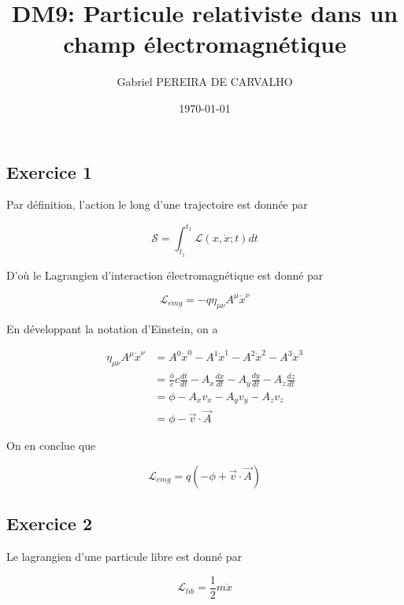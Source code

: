 \documentclass[french]{article}
\begin{document}
	\title{DM9: Particule relativiste dans un champ électromagnétique}
	\author{Gabriel PEREIRA DE CARVALHO}
	\date{\today}
	
	\maketitle
	
	\subsection*{Exercice 1}
	
	Par définition, l'action le long d'une trajectoire est donnée par
	
	\begin{equation}
		\mathcal{S} = \int_{t_1}^{t_1} \mathcal{L}(x,\dot{x};t) dt
	\end{equation}
	
	D'où le Lagrangien d'interaction électromagnétique est donné par
	
	\begin{equation}
		\mathcal{L}_{emg} = -q \eta_{\mu \nu} A^{\mu} \dot{x}^{\nu}
	\end{equation}
	
	En développant la notation d'Einstein, on a
	
	\begin{align}
		\eta_{\mu \nu} A^{\mu} \dot{x}^{\nu} &= A^0 \dot{x}^0 - A^1 \dot{x}^1 - A^2 \dot{x}^2 - A^3 \dot{x}^3 \\
		&= \frac{\phi}{c} c \frac{dt}{dt} - A_x \frac{dx}{dt} - A_y \frac{dy}{dt} - A_z \frac{dz}{dt} \\
		&= \phi - A_x v_x - A_y v_y - A_z v_z \\
		&= \phi - \vec{v} \cdot \vec{A}
	\end{align}
	
	On en conclue que
	
	\begin{equation}
	\mathcal{L}_{emg} = q \left(-\phi + \vec{v} \cdot \vec{A} \right)
	\end{equation}
	
	\subsection*{Exercice 2}
	
	Le lagrangien d'une particule libre est donné par
	
	\begin{equation}
		\mathcal{L}_{lib} = \frac{1}{2} m \dot{x}
	\end{equation}
	
\end{document}
